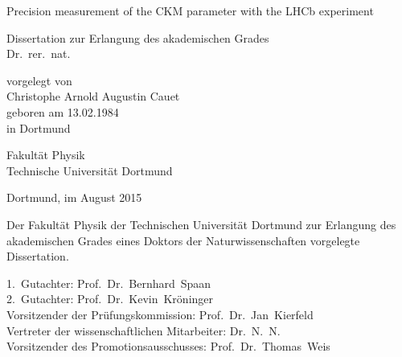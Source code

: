 
\begin{titlepage}

\vspace*{20ex}

{%
\Huge \sffamily \bfseries 
\begin{center}
  Precision measurement of the CKM parameter \sintwobetabfsf with the \acs*{LHCb} experiment
\end{center} 
}%

\begin{german}
{%
\LARGE \sffamily %
\begin{center}
  Dissertation zur Erlangung des akademischen Grades\\
  Dr.~rer.~nat.
\end{center}
}

\vspace{5ex}

{%
\Large \rmfamily
\begin{center}
  vorgelegt von \\ [0.8ex]
  Christophe Arnold Augustin Cauet \\ [0.8ex]
  geboren am 13.02.1984 \\
  in Dortmund
\end{center}
}

\vspace{5ex}

{%
\Large \rmfamily
\begin{center}
  Fakultät Physik\\
  Technische Universität Dortmund
\end{center}
}

\vspace{4ex}

{%
\Large \rmfamily
\begin{center}
  Dortmund, im August 2015
\end{center}
}

\clearpage
\thispagestyle{empty}
\vspace*{\fill}
{%
\small
  \noindent Der Fakultät Physik der Technischen Universität Dortmund zur Erlangung
  des aka\-de\-misch\-en Grades eines Doktors der Naturwissenschaften vorgelegte
  Dissertation.\\  
  
  \parbox{0.90\textwidth}{
    1.~Gutachter: Prof.~Dr.~Bernhard~Spaan \\
    2.~Gutachter: Prof.~Dr.~Kevin~Kröninger \\ [0.8ex]
    Vorsitzender der Prüfungskommission: Prof.~Dr.~Jan~Kierfeld \\
    Vertreter der wissenschaftlichen Mitarbeiter: Dr.~N.~N. \\ [0.8ex]
    Vorsitzender des Promotionsausschusses: Prof.~Dr.~Thomas~Weis \\ [0.8ex]
  }
}

\end{german}
\end{titlepage}

